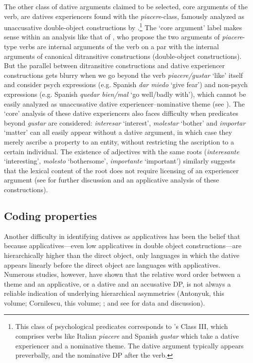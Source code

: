 \documentclass[output=paper,colorlinks,citecolor=brown,nonflat]{./langscibook}
\begin{document}
The other class of dative arguments claimed to be selected, core arguments of the verb, are datives experiencers found with the \textit{piacere}-class, famously analyzed as unaccusative double-object constructions by \citealt{BellettiRizzi1988}.\footnote{This class of psychological predicates corresponds to \citeauthor{BellettiRizzi1988}’s Class III, which comprises verbs like Italian \textit{piacere} and Spanish \textit{gustar} which take a dative experiencer and a nominative theme. The dative argument typically appears preverbally, and the nominative DP after the verb.}  The ‘core argument’ label makes sense within an analysis like that of \citeauthor{BellettiRizzi1988}, who propose the two arguments of \textit{piacere}-type verbs are internal arguments of the verb on a par with the internal arguments of canonical ditransitive constructions (double-object constructions).  But the parallel between ditransitive constructions and dative experiencer constructions gets blurry when we go beyond the verb \textit{piacere/gustar} ‘like’ itself and consider psych expressions (e.g. Spanish \textit{dar miedo} ‘give fear’) and non-psych expressions (e.g. Spanish \textit{quedar bien/mal} ‘go well/badly with’), which cannot be easily analyzed as unaccusative dative experiencer–nominative theme (see \citealt{Cuervo2011}). The ‘core’ analysis of these dative experiencers also faces difficulty when predicates beyond \textit{gustar} are considered: \textit{interesar} ‘interest’, \textit{molestar} ‘bother’ and \textit{importar} ‘matter’ can all easily appear without a dative argument, in which case they merely ascribe a property to an entity, without restricting the ascription to a certain individual. The existence of adjectives with the same roots (\textit{interesante} ‘interesting’, \textit{molesto} ‘bothersome’, \textit{importante} ‘important’) similarly suggests that the lexical content of the root does not require licensing of an experiencer argument (see  for further discussion and an applicative analysis of these constructions).

\subsection{Coding properties}\label{sec:cuervo:2.2}

Another difficulty in identifying datives as applicatives has been the belief that because applicatives—even low applicatives in double object constructions—are hierarchically higher than the direct object, only languages in which the dative appears linearly before the direct object are languages with applicatives. Numerous studies, however, have shown that the relative word order between a theme and an applicative, or a dative and an accusative DP, is not always a reliable indication of underlying hierarchical asymmetries (Antonyuk, this volume; Cornilescu, this volume; \citealt{Cuervo2003, Demonte1995, MiyagawaTsujioka2004}; and see \citealt{McGinnis2018} for data and discussion).   
\end{document}
